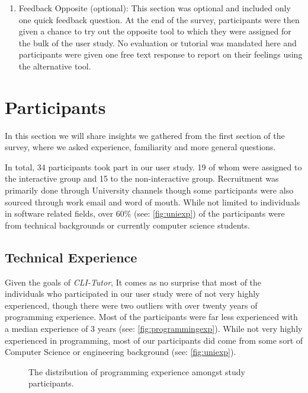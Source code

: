\begin{enumerate}
	\item Feedback Opposite (optional): This section was optional and included
	      only one quick feedback question. At the end of the survey,
	      participants were then given a chance to try out the opposite tool to
	      which they were assigned for the bulk of the user study. No evaluation
	      or tutorial was mandated here and participants were given one free text
	      response to report on their feelings using the alternative tool.
\end{enumerate}


\section{Participants}

In this section we will share insights we gathered from the first section of
the survey, where we asked experience, familiarity and more general questions.

In total, 34 participants took part in our user study. 19 of whom were assigned
to the interactive group and 15 to the non-interactive group. Recruitment was
primarily done through University channels though some participants were also
sourced through work email and word of mouth. While not limited to individuals
in software related fields, over 60\% (see: \autoref{fig:uniexp}) of the
participants were from technical backgrounds or currently computer science
students.

\subsection{Technical Experience}

Given the goals of \textit{CLI-Tutor}, It comes as no surprise that most of the
individuals who participated in our user study were of not very highly
experienced, though there were two outliers with over twenty years of
programming experience. Most of the participants were far less experienced with
a median experience of 3 years (see: \autoref{fig:programmingexp}). While not
very highly experienced in programming, most of our participants did come from
some sort of Computer Science or engineering background (see:
\autoref{fig:uniexp}).

\begin{figure}[H]
	\centering
	\scalebox{0.75}{}
	\caption{The distribution of programming experience amongst study participants.}
	\label{fig:programmingexp}
\end{figure}

